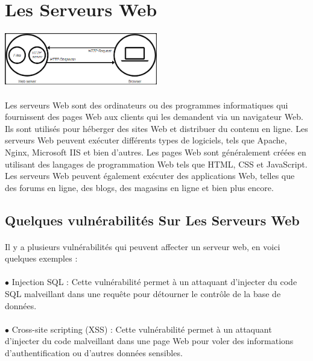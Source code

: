   
\section{Les Serveurs Web}
\vspace{4mm}
\paragraph{
	\includegraphics[width=0.5\textwidth]{PhotoMemoire/Server_web.png}}
\paragraph{ }
Les serveurs Web sont des ordinateurs ou des programmes informatiques qui fournissent des pages Web aux clients qui les demandent via un navigateur Web. Ils sont utilisés pour héberger des sites Web et distribuer du contenu en ligne. Les serveurs Web peuvent exécuter différents types de logiciels, tels que Apache, Nginx, Microsoft IIS et bien d'autres. Les pages Web sont généralement créées en utilisant des langages de programmation Web tels que HTML, CSS et JavaScript. Les serveurs Web peuvent également exécuter des applications Web, telles que des forums en ligne, des blogs, des magasins en ligne et bien plus encore.

\subsection{Quelques vulnérabilités Sur Les Serveurs Web }
\paragraph{ }
Il y a plusieurs vulnérabilités qui peuvent affecter un serveur web, en voici quelques exemples :
\paragraph{ }
$\bullet$ Injection SQL : Cette vulnérabilité permet à un attaquant d'injecter du code SQL malveillant dans une requête pour détourner le contrôle de la base de données.
\paragraph{ }
$\bullet$ Cross-site scripting (XSS) : Cette vulnérabilité permet à un attaquant d'injecter du code malveillant dans une page Web pour voler des informations d'authentification ou d'autres données sensibles.
